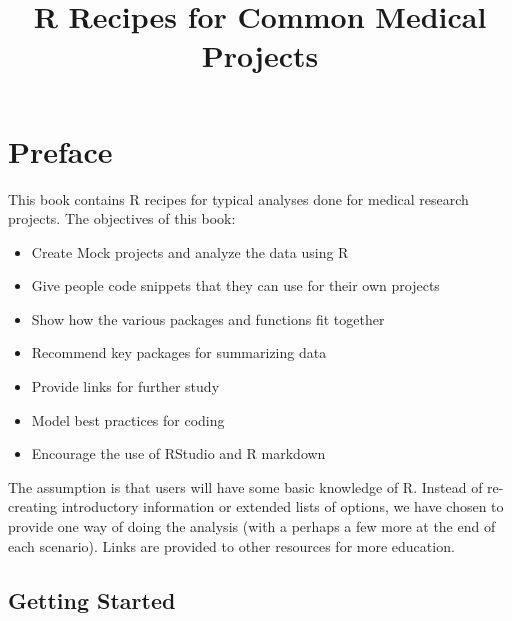\documentclass[
]{book}
\title{R Recipes for Common Medical Projects}
\author{}
\date{\vspace{-2.5em}}
\providecommand{\tightlist}{%
  \setlength{\itemsep}{0pt}\setlength{\parskip}{0pt}}
\begin{document}
\maketitle

{
\setcounter{tocdepth}{3}
\tableofcontents
}
\hypertarget{section}{%
\chapter*{}\label{section}}

\hypertarget{preface}{%
\chapter*{Preface}\label{preface}}

This book contains R recipes for typical analyses done for medical research projects. The objectives of this book:

\begin{itemize}
\tightlist
\item
  Create Mock projects and analyze the data using R
\item
  Give people code snippets that they can use for their own projects
\item
  Show how the various packages and functions fit together
\item
  Recommend key packages for summarizing data
\item
  Provide links for further study
\item
  Model best practices for coding
\item
  Encourage the use of RStudio and R markdown
\end{itemize}

The assumption is that users will have some basic knowledge of R. Instead of re-creating introductory information or extended lists of options, we have chosen to provide one way of doing the analysis (with a perhaps a few more at the end of each scenario). Links are provided to other resources for more education.

\hypertarget{getting-started}{%
\section{Getting Started}\label{getting-started}}
\end{document}
